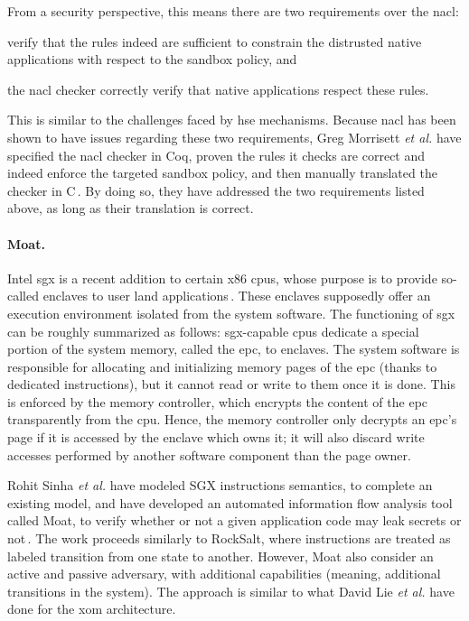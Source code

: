From a security perspective, this means there are two requirements over the
\ac{nacl}:
%
\begin{inparaenum}[(1)]
\item verify that the rules indeed are sufficient to constrain the distrusted
  native applications with respect to the sandbox policy, and
%
\item the \ac{nacl} checker correctly verify that native applications respect
  these rules.
\end{inparaenum}
%
This is similar to the challenges faced by \ac{hse} mechanisms.
%
Because \ac{nacl} has been shown to have issues regarding these two
requirements, Greg Morrisett \emph{et al.} have specified the \ac{nacl} checker
in Coq, proven the rules it checks are correct and indeed enforce the targeted
sandbox policy, and then manually translated the checker in
C\,\cite{morrisett2012rocksalt}.
%
By doing so, they have addressed the two requirements listed above, as long as
their translation is correct.

\paragraph{Moat.}
%
Intel \ac{sgx} is a recent addition to certain x86 \acp{cpu}, whose purpose is
to provide so-called enclaves to user land
applications\,\cite{costan2016sgxexplained}.
%
These enclaves supposedly offer an execution environment isolated from the
system software.
%
The functioning of \ac{sgx} can be roughly summarized as follows:
\ac{sgx}-capable \acp{cpu} dedicate a special portion of the system memory, called
the \ac{epc}, to enclaves.
%
The system software is responsible for allocating and initializing memory pages
of the \ac{epc} (thanks to dedicated instructions), but it cannot read or write
to them once it is done.
%
This is enforced by the memory controller, which encrypts the content of the
\ac{epc} transparently from the \ac{cpu}.
%
Hence, the memory controller only decrypts an \ac{epc}'s page if it is accessed
by the enclave which owns it; it will also discard write accesses performed by
another software component than the page owner.

Rohit Sinha \emph{et al.} have modeled SGX instructions semantics, to complete
an existing model, and have developed an automated information flow analysis
tool called Moat, to verify whether or not a given application code may leak
secrets or not\,\cite{sinha2015moat}.
%
The work proceeds similarly to RockSalt, where instructions are treated as
labeled transition from one state to another.
%
However, Moat also consider an active and passive adversary, with additional
capabilities (meaning, additional transitions in the system).
%
The approach is similar to what David Lie \emph{et al.} have done for the
\ac{xom} architecture.

